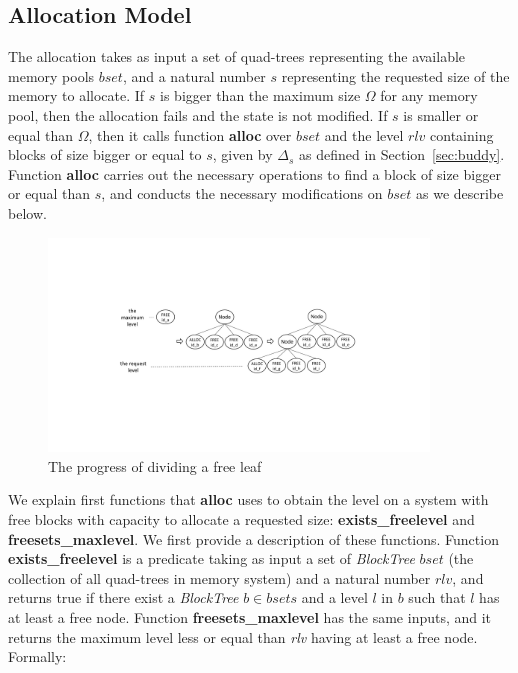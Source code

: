 
\subsection{Allocation Model}
The allocation takes as input a set of quad-trees representing the available memory pools $bset$, and a natural number $s$ representing the requested size of the memory to allocate. If $s$ is bigger than the maximum size $\Omega$ for any memory pool, then the allocation fails and the state is not modified. If $s$ is smaller or equal than $\Omega$, then it calls function \textbf{alloc} over $bset$ and the level $rlv$ containing blocks of size bigger or equal to $s$, given by $\Delta_s$ as defined in Section~\ref{sec:buddy}. Function \textbf{alloc} carries out the necessary operations to find a block of size bigger or equal than $s$, and conducts the necessary modifications on $bset$ as we describe below.

\begin{figure}[htbp]
	\centering
	\includegraphics[width=0.9\textwidth]{fig1.pdf}
	\caption{The progress of dividing a free leaf}
	\label{fig:splitleaf}
\end{figure}

We explain first functions that \textbf{alloc} uses to obtain the level on a system with free blocks with capacity to allocate a requested size: \textbf{exists\_freelevel} and \textbf{freesets\_maxlevel}. We first provide a description of these functions. Function \textbf{exists\_freelevel} is a predicate taking as input a set of \emph{BlockTree} $bset$ (the collection of all quad-trees in memory system) and a natural number $rlv$, and returns true if there exist a \emph{BlockTree} $b \in bsets$ and a level $l$ in $b$ such that $l$ has at least a free node. Function \textbf{freesets\_maxlevel} has the same inputs, and it returns the maximum level less or equal than \emph{rlv} having at least a free node. Formally:

